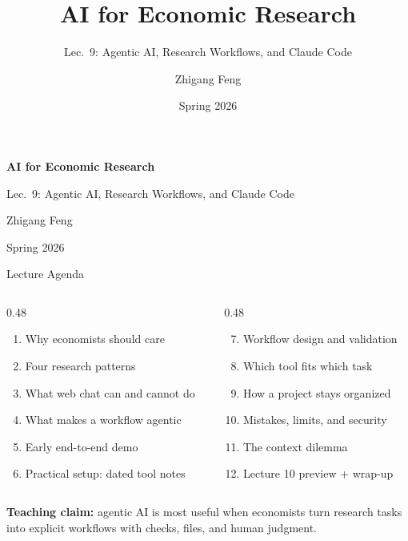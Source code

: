 \documentclass[10pt,english,aspectratio=169]{beamer}
\title[AI for Economic Research]{AI for Economic Research}
\subtitle{Lec.~9: Agentic AI, Research Workflows, and Claude Code}
\author{Zhigang Feng}
\date{Spring 2026}
\begin{document}
\begin{frame}[plain]
\begin{center}
\vspace{1.2cm}
{\Large\textbf{AI for Economic Research}\par}
\vspace{0.35cm}
{\large Lec.~9: Agentic AI, Research Workflows, and Claude Code\par}
\vspace{0.8cm}
{\normalsize Zhigang Feng\par}
\vspace{0.1cm}
{\normalsize Spring 2026\par}
\end{center}
\end{frame}


\begin{frame}{Lecture Agenda}
\begin{columns}[T]
\begin{column}{0.48\textwidth}
\begin{enumerate}
    \item Why economists should care
    \item Four research patterns
    \item What web chat can and cannot do
    \item What makes a workflow agentic
    \item Early end-to-end demo
    \item Practical setup: dated tool notes
\end{enumerate}
\end{column}
\begin{column}{0.48\textwidth}
\begin{enumerate}
    \setcounter{enumi}{6}
    \item Workflow design and validation
    \item Which tool fits which task
    \item How a project stays organized
    \item Mistakes, limits, and security
    \item The context dilemma
    \item Lecture 10 preview + wrap-up
\end{enumerate}
\end{column}
\end{columns}

\vspace{0.3cm}

\textbf{Teaching claim:} agentic AI is most useful when economists turn research tasks into explicit workflows with checks, files, and human judgment.
\end{frame}
\end{document}
